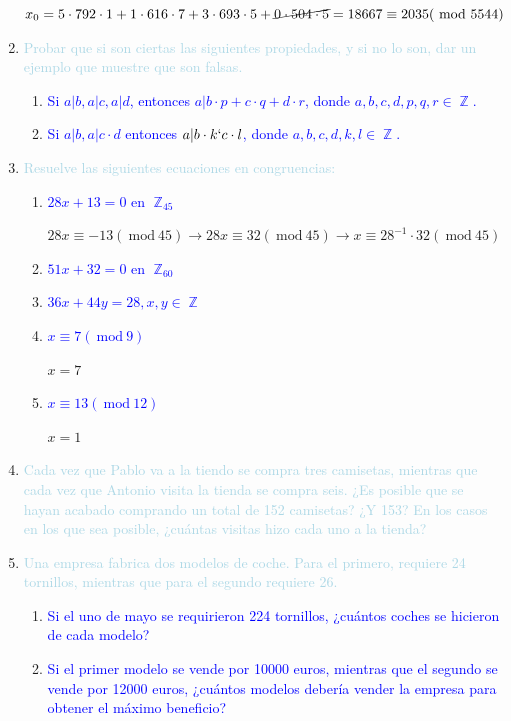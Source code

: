 \documentclass{article}
\newcommand{\lb}[1]{\textcolor{lightblue}{#1}}
\newcommand{\db}[1]{\textcolor{blue}{#1}}
\DeclareMathOperator{\Z}{\mathbb{Z}}
\renewcommand{\mod}{~\mathrm{mod}~}
\begin{document}
\begin{enumerate}[label=\color{red}\textbf{\arabic*)}, leftmargin=*]
    $x_0=5\cdot792\cdot1+1\cdot616\cdot7+3\cdot693\cdot5+\cancel{0\cdot504\cdot5}=18667\equiv2035(\mod5544)$
   	\item \lb{Probar que si son ciertas las siguientes propiedades, y si no lo son, dar un ejemplo que muestre que son falsas.}
	\begin{enumerate}[label=\color{red}\alph*)]
		\item \db{Si $a|b,a|c,a|d$, entonces $a|b\cdot p+c\cdot q+d\cdot r$, donde $a,b,c,d,p,q,r\in\Z$.}
		\item \db{Si $a|b,a|c\cdot d$ entonces $a|b\cdot k`c\cdot l$, donde $a,b,c,d,k,l\in\Z$.}
	\end{enumerate}
	\item \lb{Resuelve las siguientes ecuaciones en congruencias:}
	\begin{enumerate}[label=\color{red}\alph*)]
		\item \db{$28x+13=0$ en $\Z_{45}$}
		
		$28x\equiv-13(\mod45)\longrightarrow28x\equiv32(\mod45)\longrightarrow x\equiv28^{-1}\cdot32(\mod45)$
		\item \db{$51x+32=0$ en $\Z_{60}$}
		\item \db{$36x+44y=28, x,y\in \Z$}
		\item \db{$x\equiv7(\mod9)$}
		
		$x=7$
		\item \db{$x\equiv13(\mod12)$}
		
		$x=1$
	\end{enumerate}
	\item \lb{Cada vez que Pablo va a la tiendo se compra tres camisetas, mientras que cada vez que Antonio visita la tienda se compra seis. ¿Es posible que se hayan acabado comprando un total de 152 camisetas? ¿Y 153? En los casos en los que sea posible, ¿cuántas visitas hizo cada uno a la tienda?}
	\item \lb{Una empresa fabrica dos modelos de coche. Para el primero, requiere 24 tornillos, mientras que para el segundo requiere 26.}
	\begin{enumerate}[label=\color{red}\alph*)]
		\item \db{Si el uno de mayo se requirieron 224 tornillos, ¿cuántos coches se hicieron de cada modelo?}
		\item \db{Si el primer modelo se vende por 10000 euros, mientras que el segundo se vende por 12000 euros, ¿cuántos modelos debería vender la empresa para obtener el máximo beneficio?}
	\end{enumerate}
\end{enumerate}
\newpage
\end{document}
